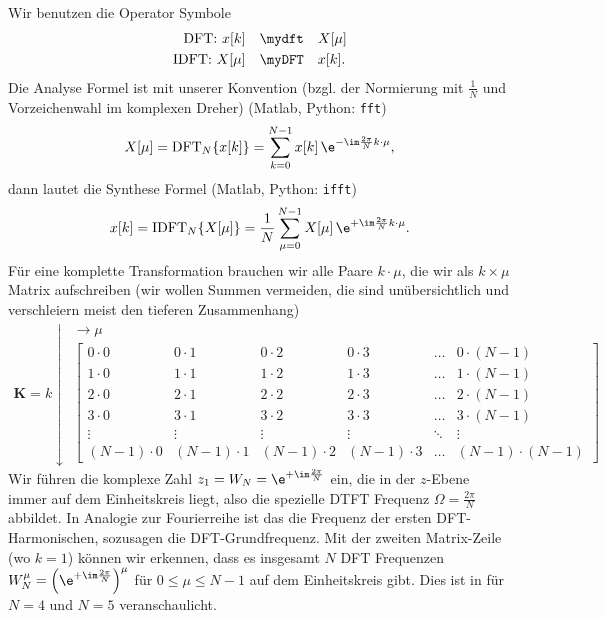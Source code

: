 Wir benutzen die Operator Symbole
\begin{align}
\text{DFT: }x[k] &\quad\mydft\quad X[\mu]\\
\text{IDFT: }X[\mu] &\quad\myDFT\quad x[k].
\end{align}
%
Die Analyse Formel ist mit unserer Konvention
(bzgl. der Normierung mit $\frac{1}{N}$ und Vorzeichenwahl im komplexen Dreher)
(Matlab, Python: \texttt{fft})
\begin{align}
X[\mu] = \mathrm{DFT}_N\{x[k]\} = \sum_{k=0}^{N-1} x[k] \, \e^{-\im\frac{2\pi}{N} k \cdot \mu},
\end{align}
dann lautet die Synthese Formel (Matlab, Python: \texttt{ifft})
\begin{align}
x[k] = \mathrm{IDFT}_N\{X[\mu]\} = \frac{1}{N} \sum_{\mu=0}^{N-1} X[\mu] \, \e^{+\im\frac{2\pi}{N} k \cdot \mu}.
\end{align}
%
Für eine komplette Transformation brauchen wir alle Paare $k \cdot \mu$,
die wir als $k \times \mu$ Matrix aufschreiben (wir wollen Summen vermeiden,
die sind unübersichtlich und verschleiern meist den tieferen Zusammenhang)
\begin{align}
\bm{K} =
k \downarrow
\substack{\rightarrow \mu\\
\begin{bmatrix}
0 \cdot 0 & 0 \cdot 1 & 0 \cdot 2 & 0 \cdot 3 & \dots & 0 \cdot (N-1)\\
1 \cdot 0 & 1 \cdot 1 & 1 \cdot 2 & 1 \cdot 3 & \dots & 1 \cdot (N-1)\\
2 \cdot 0 & 2 \cdot 1 & 2 \cdot 2 & 2 \cdot 3 & \dots & 2 \cdot (N-1)\\
3 \cdot 0 & 3 \cdot 1 & 3 \cdot 2 & 3 \cdot 3 & \dots & 3 \cdot (N-1)\\
\vdots & \vdots & \vdots & \vdots & \ddots & \vdots\\
(N-1) \cdot 0 & (N-1) \cdot 1 & (N-1) \cdot 2 & (N-1) \cdot 3 & \dots &  (N-1) \cdot (N-1)
\end{bmatrix}
}
\end{align}
Wir führen die komplexe Zahl $z_1 = W_N = \e^{+\im\frac{2\pi}{N}}$ ein, die
in der $z$-Ebene immer auf dem Einheitskreis liegt, also die spezielle DTFT
Frequenz $\Omega = \frac{2\pi}{N}$ abbildet. In Analogie zur Fourierreihe ist
das die Frequenz der ersten DFT-Harmonischen, sozusagen die DFT-Grundfrequenz.
Mit der zweiten Matrix-Zeile (wo $k=1$) können wir erkennen,
dass es insgesamt $N$ DFT Frequenzen
$W_N^\mu=\left(\e^{+\im\frac{2\pi}{N}}\right)^\mu$ für $0\leq\mu\leq N-1$
auf dem Einheitskreis gibt.
%
Dies ist in  für $N=4$ und $N=5$ veranschaulicht.
